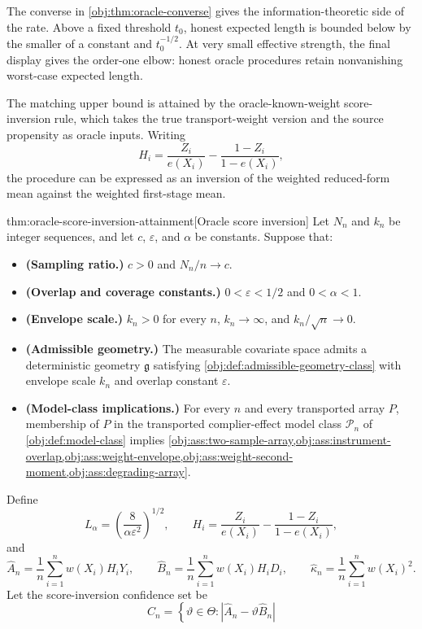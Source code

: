 The converse in \cref{obj:thm:oracle-converse} gives the information-theoretic side of the rate. Above a fixed threshold \(t_0\), honest expected length is bounded below by the smaller of a constant and \(t_0^{-1/2}\). At very small effective strength, the final display gives the order-one elbow: honest oracle procedures retain nonvanishing worst-case expected length.

The matching upper bound is attained by the oracle-known-weight score-inversion rule, which takes the true transport-weight version and the source propensity as oracle inputs. Writing
\[
H_i=\frac{Z_i}{e(X_i)}-\frac{1-Z_i}{1-e(X_i)},
\]
the procedure can be expressed as an inversion of the weighted reduced-form mean against the weighted first-stage mean.

\begin{theoremv}{thm:oracle-score-inversion-attainment}[Oracle score inversion]
Let \(N_n\) and \(k_n\) be integer sequences, and let \(c\), \(\varepsilon\), and \(\alpha\) be constants.  Suppose that:
\begin{itemize}
\item \textbf{(Sampling ratio.)} \(c>0\) and \(N_n/n\to c\).
\item \textbf{(Overlap and coverage constants.)} \(0<\varepsilon<1/2\) and \(0<\alpha<1\).
\item \textbf{(Envelope scale.)} \(k_n>0\) for every \(n\), \(k_n\to\infty\), and \(k_n/\sqrt n\to0\).
\item \textbf{(Admissible geometry.)} The measurable covariate space admits a deterministic geometry \(\mathfrak g\) satisfying \cref{obj:def:admissible-geometry-class} with envelope scale \(k_n\) and overlap constant \(\varepsilon\).
\item \textbf{(Model-class implications.)} For every \(n\) and every transported array \(P\), membership of \(P\) in the transported complier-effect model class \(\mathcal P_n\) of \cref{obj:def:model-class} implies \cref{obj:ass:two-sample-array,obj:ass:instrument-overlap,obj:ass:weight-envelope,obj:ass:weight-second-moment,obj:ass:degrading-array}.
\end{itemize}
Define
\[
L_\alpha=\left(\frac{8}{\alpha\varepsilon^2}\right)^{1/2},
\qquad
H_i=\frac{Z_i}{e(X_i)}-\frac{1-Z_i}{1-e(X_i)},
\]
and
\[
\widehat A_n=\frac1n\sum_{i=1}^n w(X_i)H_iY_i,
\qquad
\widehat B_n=\frac1n\sum_{i=1}^n w(X_i)H_iD_i,
\qquad
\widehat\kappa_n=\frac1n\sum_{i=1}^n w(X_i)^2 .
\]
Let the score-inversion confidence set be
\[
C_n
=
\left\{\vartheta\in\Theta:
\left|\widehat A_n-\vartheta\widehat B_n\right|
\]
\end{theoremv}
